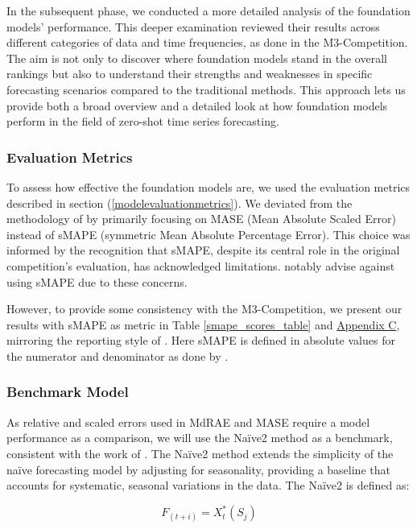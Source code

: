 \documentclass[12pt,a4paper]{article}
\begin{document}
In the subsequent phase, we conducted a more detailed analysis of the foundation models’ performance. This deeper examination reviewed their results across different categories of data and time frequencies, as done in the M3-Competition. The aim is not only to discover where foundation models stand in the overall rankings but also to understand their strengths and weaknesses in specific forecasting scenarios compared to the traditional methods. This approach lets us provide both a broad overview and a detailed look at how foundation models perform in the field of zero-shot time series forecasting.

\subsubsection{Evaluation Metrics}

To assess how effective the foundation models are, we used the evaluation metrics described in section (\ref{modelevaluationmetrics}). We deviated from the methodology of \cite{MAKRIDAKIS2000} by primarily focusing on MASE (Mean Absolute Scaled Error) instead of sMAPE (symmetric Mean Absolute Percentage Error). This choice was informed by the recognition that sMAPE, despite its central role in the original competition's evaluation, has acknowledged limitations. \cite{HyndmanAccuracy2006} notably advise against using sMAPE due to these concerns.

However, to provide some consistency with the M3-Competition, we present our results with sMAPE as metric in Table \ref{smape_scores_table} and \hyperref[appendix_c]{Appendix C}, mirroring the reporting style of \cite{MAKRIDAKIS2000}. Here sMAPE is defined in absolute values for the numerator and denominator as done by \cite{Makridakis2019}.

\subsubsection{Benchmark Model}

As relative and scaled errors used in MdRAE and MASE require a model performance as a comparison, we will use the Naïve2 method as a benchmark, consistent with the work of \cite{MAKRIDAKIS2000}. The Naïve2 method extends the simplicity of the naïve forecasting model by adjusting for seasonality, providing a baseline that accounts for systematic, seasonal variations in the data. The Naïve2 is defined as:

\begin{equation}
  F_{\left(t+i\right)}=X_t^\ast\left(S_j\right)
\end{equation}
\end{document}
